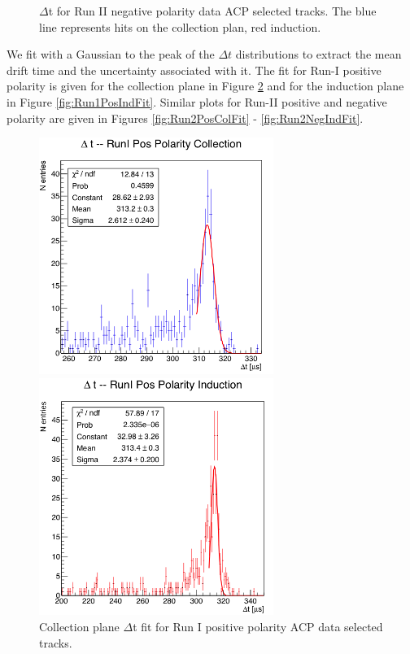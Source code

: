 \begin{figure}[]
\begin{minipage}{0.45\textwidth}
\caption{$\Delta$t for Run II negative polarity data ACP selected tracks.  The blue line represents hits on the collection plan, red induction.}
\label{fig:RunIINegACP}
\end{minipage}
\end{figure}

\newpage
\clearpage

We fit with a Gaussian to the peak of the $\Delta t$ distributions to extract the mean drift time and the uncertainty associated with it. The fit for Run-I positive polarity is given for the collection plane in Figure \ref{fig:Run1PosCollFit} and for the induction plane in Figure \ref{fig:Run1PosIndFit}. Similar plots for Run-II positive and negative polarity are given in Figures \ref{fig:Run2PosColFit} - \ref{fig:Run2NegIndFit}.

   
\begin{figure}[h!]
\centering
\begin{minipage}{0.40\textwidth}
\centering
\includegraphics[width=3in]{images/RunIPosCol.png}
\caption{Collection plane $\Delta$t fit  for Run I positive polarity ACP data selected tracks. }
\label{fig:Run1PosCollFit}
\end{minipage}\hfill
\begin{minipage}{0.40\textwidth}
\centering
\includegraphics[width=3in]{images/RunIPosInd.png}

\end{minipage}
\end{figure}
